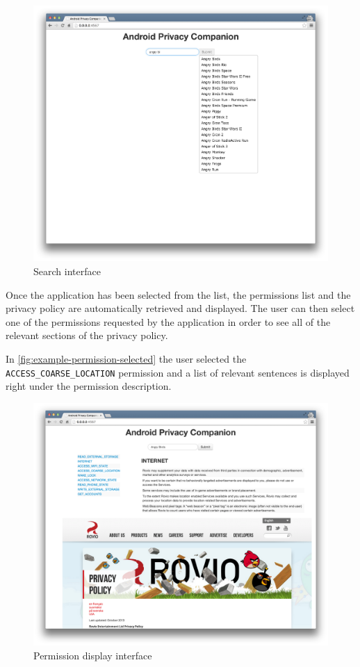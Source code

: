 \begin{figure}[t]
\centering
     \includegraphics[width=.8\textwidth]{images/example-search}
      \caption{Search interface}
      \label{fig:example-search}
\end{figure}

Once the application has been selected from the list, the permissions list and the privacy policy are automatically retrieved and displayed.
The user can then select one of the permissions requested by the application in order to see all of the relevant sections of the privacy policy.

In \autoref{fig:example-permission-selected} the user selected the \texttt{ACCESS\_COARSE\_LOCATION} permission and a list of relevant sentences is displayed right under the permission description.

\begin{figure}[b]
\centering
     \includegraphics[width=.8\textwidth]{images/example-permission-selected}
      \caption{Permission display interface}
      \label{fig:example-permission-selected}
\end{figure}